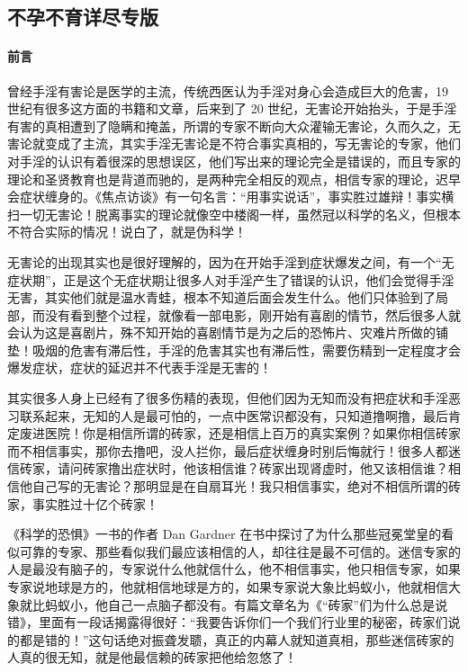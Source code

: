 \subsection{不孕不育详尽专版}

\paragraph*{前言}

曾经手淫有害论是医学的主流，传统西医认为手淫对身心会造成巨大的危害，19 世纪有很多这方面的书籍和文章，后来到了 20 世纪，无害论开始抬头，于是手淫有害的真相遭到了隐瞒和掩盖，所谓的专家不断向大众灌输无害论，久而久之，无害论就变成了主流，其实手淫无害论是不符合事实真相的，写无害论的专家，他们对手淫的认识有着很深的思想误区，他们写出来的理论完全是错误的，而且专家的理论和圣贤教育也是背道而驰的，是两种完全相反的观点，相信专家的理论，迟早会症状缠身的。《焦点访谈》有一句名言：“用事实说话”，事实胜过雄辩！事实横扫一切无害论！脱离事实的理论就像空中楼阁一样，虽然冠以科学的名义，但根本不符合实际的情况！说白了，就是伪科学！

无害论的出现其实也是很好理解的，因为在开始手淫到症状爆发之间，有一个“无症状期”，正是这个无症状期让很多人对手淫产生了错误的认识，他们会觉得手淫无害，其实他们就是温水青蛙，根本不知道后面会发生什么。他们只体验到了局部，而没有看到整个过程，就像看一部电影，刚开始有喜剧的情节，然后很多人就会认为这是喜剧片，殊不知开始的喜剧情节是为之后的恐怖片、灾难片所做的铺垫！吸烟的危害有滞后性，手淫的危害其实也有滞后性，需要伤精到一定程度才会爆发症状，症状的延迟并不代表手淫是无害的！

其实很多人身上已经有了很多伤精的表现，但他们因为无知而没有把症状和手淫恶习联系起来，无知的人是最可怕的，一点中医常识都没有，只知道撸啊撸，最后肯定废进医院！你是相信所谓的砖家，还是相信上百万的真实案例？如果你相信砖家而不相信事实，那你去撸吧，没人拦你，最后症状缠身时别后悔就行！很多人都迷信砖家，请问砖家撸出症状时，他该相信谁？砖家出现肾虚时，他又该相信谁？相信他自己写的无害论？那明显是在自扇耳光！我只相信事实，绝对不相信所谓的砖家，事实胜过十亿个砖家！

《科学的恐惧》一书的作者 Dan Gardner 在书中探讨了为什么那些冠冕堂皇的看似可靠的专家、那些看似我们最应该相信的人，却往往是最不可信的。迷信专家的人是最没有脑子的，专家说什么他就信什么，他不相信事实，他只相信专家，如果专家说地球是方的，他就相信地球是方的，如果专家说大象比蚂蚁小，他就相信大象就比蚂蚁小，他自己一点脑子都没有。有篇文章名为《“砖家”们为什么总是说错》，里面有一段话揭露得很好：“我要告诉你们一个我们行业里的秘密，砖家们说的都是错的！”这句话绝对振聋发聩，真正的内幕人就知道真相，那些迷信砖家的人真的很无知，就是他最信赖的砖家把他给忽悠了！

